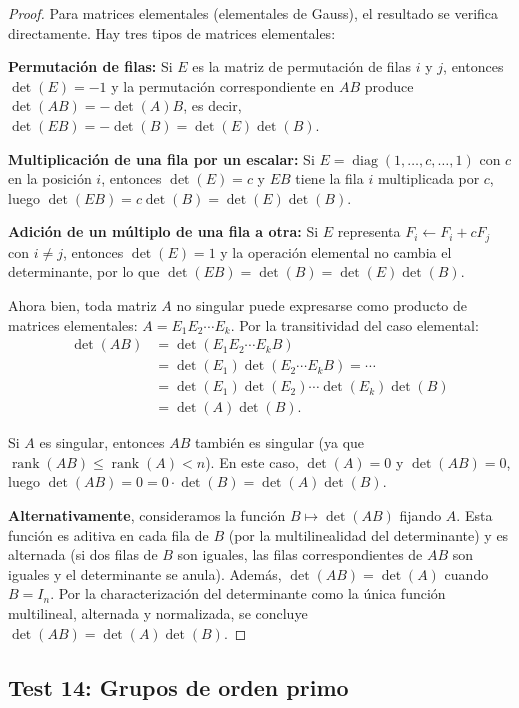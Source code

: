 \documentclass[11pt,a4paper]{article}
\theoremstyle{plain}
\theoremstyle{definition}
\begin{document}
\begin{proof}
Para matrices elementales (elementales de Gauss), el resultado se verifica directamente. Hay tres tipos de matrices elementales:

\textbf{Permutación de filas:} Si $E$ es la matriz de permutación de filas $i$ y $j$, entonces $\det(E) = -1$ y la permutación correspondiente en $AB$ produce $\det(AB) = -\det(A)B$, es decir, $\det(EB) = -\det(B) = \det(E)\det(B)$.

\textbf{Multiplicación de una fila por un escalar:} Si $E = \operatorname{diag}(1,\ldots,c,\ldots,1)$ con $c$ en la posición $i$, entonces $\det(E) = c$ y $EB$ tiene la fila $i$ multiplicada por $c$, luego $\det(EB) = c\det(B) = \det(E)\det(B)$.

\textbf{Adición de un múltiplo de una fila a otra:} Si $E$ representa $F_i \leftarrow F_i + cF_j$ con $i \neq j$, entonces $\det(E) = 1$ y la operación elemental no cambia el determinante, por lo que $\det(EB) = \det(B) = \det(E)\det(B)$.

Ahora bien, toda matriz $A$ no singular puede expresarse como producto de matrices elementales: $A = E_1 E_2 \cdots E_k$. Por la transitividad del caso elemental:
\begin{align*}
\det(AB) &= \det(E_1 E_2 \cdots E_k B) \\
          &= \det(E_1)\det(E_2 \cdots E_k B) = \cdots \\
          &= \det(E_1)\det(E_2)\cdots\det(E_k)\det(B) \\
          &= \det(A)\det(B).
\end{align*}

Si $A$ es singular, entonces $AB$ también es singular (ya que $\operatorname{rank}(AB) \leq \operatorname{rank}(A) < n$). En este caso, $\det(A) = 0$ y $\det(AB) = 0$, luego $\det(AB) = 0 = 0 \cdot \det(B) = \det(A)\det(B)$.

\textbf{Alternativamente}, consideramos la función $B \mapsto \det(AB)$ fijando $A$. Esta función es aditiva en cada fila de $B$ (por la multilinealidad del determinante) y es alternada (si dos filas de $B$ son iguales, las filas correspondientes de $AB$ son iguales y el determinante se anula). Además, $\det(AB) = \det(A)$ cuando $B = I_n$. Por la characterización del determinante como la única función multilineal, alternada y normalizada, se concluye $\det(AB) = \det(A)\det(B)$.
\end{proof}

\subsection{Test 14: Grupos de orden primo}
\end{document}

